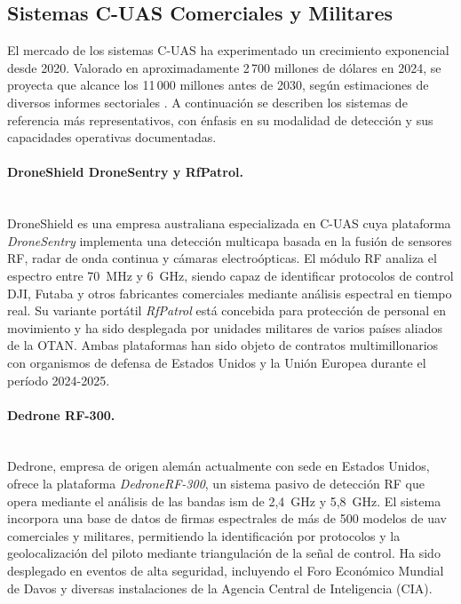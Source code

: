 \subsection{Sistemas C-UAS Comerciales y Militares}
\label{subsec:sistemas_comerciales}

El mercado de los sistemas C-UAS ha experimentado un crecimiento exponencial desde
2020. Valorado en aproximadamente 2\,700 millones de dólares en 2024, se proyecta
que alcance los 11\,000 millones antes de 2030, según estimaciones de diversos
informes sectoriales \cite{dod_cuas_2021}. A continuación se describen los sistemas de referencia más
representativos, con énfasis en su modalidad de detección y sus capacidades
operativas documentadas.

\paragraph{DroneShield DroneSentry y RfPatrol.}\mbox{}\\[0.5em]
DroneShield es una empresa australiana especializada en C-UAS cuya plataforma
\textit{DroneSentry} implementa una detección multicapa basada en la fusión de
sensores RF, radar de onda continua y cámaras electroópticas. El módulo RF analiza
el espectro entre 70\, MHz y 6\, GHz, siendo capaz de identificar protocolos de
control DJI, Futaba y otros fabricantes comerciales mediante análisis espectral en
tiempo real. Su variante portátil \textit{RfPatrol} está concebida para protección
de personal en movimiento y ha sido desplegada por unidades militares de varios
países aliados de la OTAN. Ambas plataformas han sido objeto de contratos
multimillonarios con organismos de defensa de Estados Unidos y la Unión Europea
durante el período 2024-2025.

\paragraph{Dedrone RF-300.}\mbox{}\\[0.5em]
Dedrone, empresa de origen alemán actualmente con sede en Estados Unidos, ofrece
la plataforma \textit{DedroneRF-300}, un sistema pasivo de detección RF que opera
mediante el análisis de las bandas \gls{ism} de 2,4\, GHz y 5,8\, GHz. El sistema
incorpora una base de datos de firmas espectrales de más de 500 modelos de \gls{uav}
comerciales y militares, permitiendo la identificación por protocolos y la
geolocalización del piloto mediante triangulación de la señal de control. Ha sido
desplegado en eventos de alta seguridad, incluyendo el Foro Económico Mundial de
Davos y diversas instalaciones de la Agencia Central de Inteligencia (CIA).

